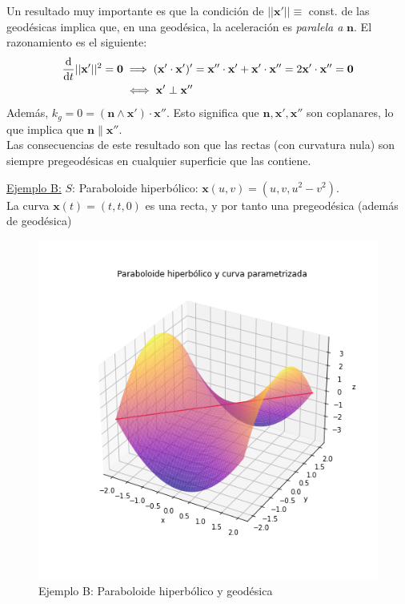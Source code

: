 Un resultado muy importante es que la condición de $||\mathbf{x}'||\equiv $ const. de las geodésicas implica que, en una geodésica, la aceleración es \emph{paralela a} $\mathbf{n}$. El razonamiento es el siguiente:
\begin{align*}
    \dv{}{t}||\mathbf{x}'||^2=\mathbf{0}&\implies (\mathbf{x}'\cdot \mathbf{x}')'=\mathbf{x}''\cdot \mathbf{x}' +\mathbf{x}'\cdot \mathbf{x}''=2\mathbf{x}'\cdot \mathbf{x}''=\mathbf{0}\\
    &\iff \mathbf{x}'\perp \mathbf{x}''
\end{align*}
Además, $k_g=0=(\mathbf{n}\wedge \mathbf{x}')\cdot \mathbf{x}''$. Esto significa que $\mathbf{n,x',x''}$ son coplanares, lo que implica que $\mathbf{n}\parallel \mathbf{x}''$.\\

Las consecuencias de este resultado son que las rectas (con curvatura nula) son siempre pregeodésicas en cualquier superficie que las contiene.
\begin{mybox}
    \underline{Ejemplo B:} $S$: Paraboloide hiperbólico: $\mathbf{x}(u,v)=(u,v,u^2-v^2)$.\\
    La curva $\mathbf{x}(t)=(t,t,0)$ es una recta, y por tanto una pregeodésica (además de geodésica)
\end{mybox}
\newpage
    \begin{figure}[!h]
        \centering
        \includegraphics[scale=.5]{FOTOS/hiperb_curva.png}
        \caption*{Ejemplo B: Paraboloide hiperbólico y geodésica}
        \label{fig:ej4B}
    \end{figure}
